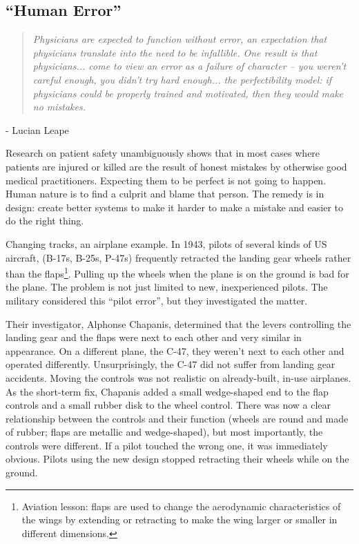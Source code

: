 \subsection*{``Human Error''}
\begin{quote}
\textit{Physicians are expected to function without error, an expectation that physicians translate into the need to be infallible. One result is that physicians... come to view an error as a failure of character -- you weren't careful enough, you didn't try hard enough... the perfectibility model: if physicians could be properly trained and motivated, then they would make no mistakes.}
\end{quote}
\hfill - Lucian Leape

Research on patient safety unambiguously shows that in most cases where patients are injured or killed are the result of honest mistakes by otherwise good medical practitioners. Expecting them to be perfect is not going to happen. Human nature is to find a culprit and blame that person. The remedy is in design: create better systems to make it harder to make a mistake and easier to do the right thing.

Changing tracks, an airplane example. In 1943, pilots of several kinds of US aircraft, (B-17s, B-25s, P-47s) frequently retracted the landing gear wheels rather than the flaps\footnote{Aviation lesson: flaps are used to change the aerodynamic characteristics of the wings by extending or retracting to make the wing larger or smaller in different dimensions.}. Pulling up the wheels when the plane is on the ground is bad for the plane. The problem is not just limited to new, inexperienced pilots. The military considered this ``pilot error'', but they investigated the matter.

Their investigator, Alphonse Chapanis, determined that the levers controlling the landing gear and the flaps were next to each other and very similar in appearance. On a different plane, the C-47, they weren't next to each other and operated differently. Unsurprisingly, the C-47 did not suffer from landing gear accidents. Moving the controls was not realistic on already-built, in-use airplanes. As the short-term fix, Chapanis added a small wedge-shaped end to the flap controls and a small rubber disk to the wheel control. There was now a clear relationship between the controls and their function (wheels are round and made of rubber; flaps are metallic and wedge-shaped), but most importantly, the controls were different. If a pilot touched the wrong one, it was immediately obvious. Pilots using the new design stopped retracting their wheels while on the ground.


